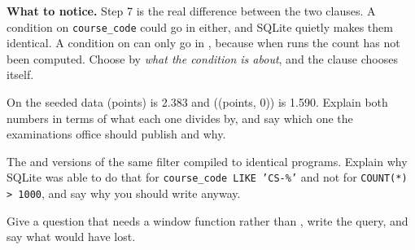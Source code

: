 \begin{lab}
\smallskip
\textbf{What to notice.} Step 7 is the real difference between the two
clauses. A condition on \texttt{course\_code} could go in either, and SQLite
quietly makes them identical. A condition on  can only go in
, because when  runs the count has not been
computed. Choose by \emph{what the condition is about}, and the clause chooses
itself.
\end{lab}

\begin{checkpoint}
\begin{tightnum}
  \item On the seeded data (points) is 2.383 and
        ((points, 0)) is 1.590. Explain both
        numbers in terms of what each one divides by, and say which one the
        examinations office should publish and why.
  \item The  and  versions of the same filter
        compiled to identical programs. Explain why SQLite was able to do that
        for \texttt{course\_code LIKE 'CS-\%'} and not for \texttt{COUNT(*) >
        1000}, and say why you should write  anyway.
  \item Give a question that needs a window function rather than
        , write the query, and say what  would
        have lost.
\end{tightnum}
\end{checkpoint}

